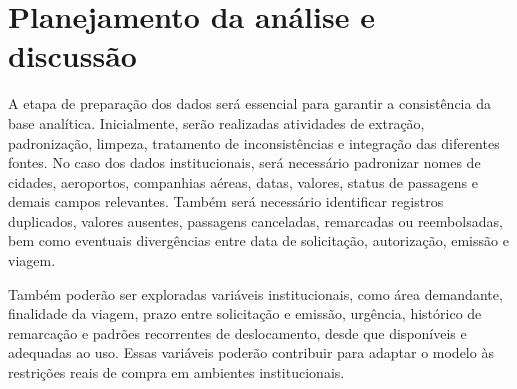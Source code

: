 \section{Planejamento da análise e discussão}

A etapa de preparação dos dados será essencial para garantir a consistência da base analítica. Inicialmente, serão realizadas atividades de extração, padronização, limpeza, tratamento de inconsistências e integração das diferentes fontes. No caso dos dados institucionais, será necessário padronizar nomes de cidades, aeroportos, companhias aéreas, datas, valores, status de passagens e demais campos relevantes. Também será necessário identificar registros duplicados, valores ausentes, passagens canceladas, remarcadas ou reembolsadas, bem como eventuais divergências entre data de solicitação, autorização, emissão e viagem.

Também poderão ser exploradas variáveis institucionais, como área demandante, finalidade da viagem, prazo entre solicitação e emissão, urgência, histórico de remarcação e padrões recorrentes de deslocamento, desde que disponíveis e adequadas ao uso. Essas variáveis poderão contribuir para adaptar o modelo às restrições reais de compra em ambientes institucionais.
